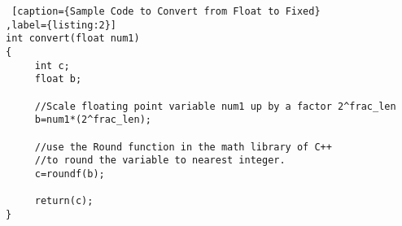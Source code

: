 \lstset{framesep=-10pt, xleftmargin=-10pt}
\begin{lstlisting} [caption={Sample Code to Convert from Float to Fixed}
,label={listing:2}]
int convert(float num1)
{
     int c;
     float b;
     
     //Scale floating point variable num1 up by a factor 2^frac_len
     b=num1*(2^frac_len);
     
     //use the Round function in the math library of C++ 
     //to round the variable to nearest integer.
     c=roundf(b);
     
     return(c);
}
\end{lstlisting}


